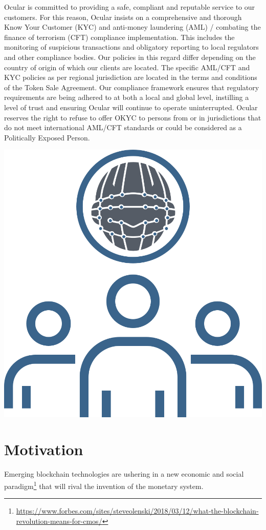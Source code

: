 \documentclass[a4paper]{article}
\begin{document}
Ocular is committed to providing a safe, compliant and reputable service to our customers. For this reason, Ocular insists on a comprehensive and thorough Know Your Customer (KYC) and anti-money laundering (AML) / combating the finance of terrorism (CFT) compliance implementation. This includes the monitoring of suspicious transactions and obligatory reporting to local regulators and other compliance bodies. Our policies in this regard differ depending on the country of origin of which our clients are located. The specific AML/CFT and KYC policies as per regional jurisdiction are located in the terms and conditions of the Token Sale Agreement. Our compliance framework ensures that regulatory requirements are being adhered to at both a local and global level, instilling a level of trust and ensuring Ocular will continue to operate uninterrupted. Ocular reserves the right to refuse to offer OKYC to persons from or in jurisdictions that do not meet international AML/CFT standards or could be considered as a Politically Exposed Person.
\clearpage
\centerline{\includegraphics[width=1.0\textwidth]{ocular-kyc-aml}}

\section{Motivation}
Emerging blockchain technologies are ushering in a new economic and social paradigm\footnote{\url{https://www.forbes.com/sites/steveolenski/2018/03/12/what-the-blockchain-revolution-means-for-cmos/}} that will rival the invention of the monetary system. 
\end{document}
